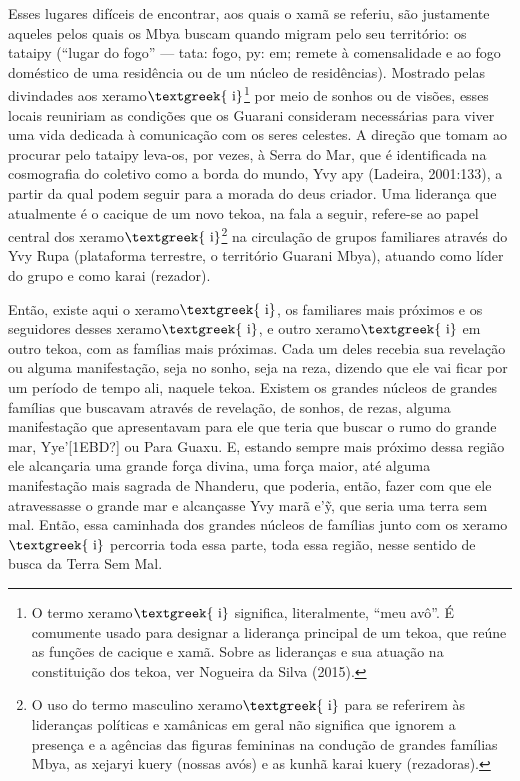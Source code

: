\documentclass{article}
\begin{document}
Esses lugares dif\'iceis de encontrar, aos quais o xam\~a se referiu,
s\~ao justamente aqueles pelos quais os Mbya buscam quando migram pelo
seu territ\'orio: os tataipy ({\textquotedblleft}lugar do
fogo{\textquotedblright} --- tata: fogo, py: em; remete \`a
comensalidade e ao fogo dom\'estico de uma resid\^encia ou de um
n\'ucleo de resid\^encias). Mostrado pelas divindades aos
xeramo$\text{\textgreek{~i}}$\footnote{ O termo
xeramo$\text{\textgreek{~i}}$ significa, literalmente,
{\textquotedblleft}meu av\^o{\textquotedblright}. \'E comumente usado
para designar a lideran\c{c}a principal de um tekoa, que re\'une as
fun\c{c}\~oes de cacique e xam\~a. Sobre as lideran\c{c}as e sua
atua\c{c}\~ao na constitui\c{c}\~ao dos tekoa, ver Nogueira da Silva
(2015).} por meio de sonhos ou de vis\~oes, esses locais reuniriam as
condi\c{c}\~oes que os Guarani consideram necess\'arias para viver uma
vida dedicada \`a comunica\c{c}\~ao com os seres celestes. A
dire\c{c}\~ao que tomam ao procurar pelo tataipy leva-os, por vezes,
\`a Serra do Mar, que \'e identificada na cosmografia do coletivo como
a borda do mundo, Yvy apy (Ladeira, 2001:133), a partir da qual podem
seguir para a morada do deus criador. Uma lideran\c{c}a que atualmente
\'e o cacique de um novo tekoa, na fala a seguir, refere-se ao papel
central dos xeramo$\text{\textgreek{~i}}$\footnote{ O uso do termo
masculino xeramo$\text{\textgreek{~i}}$ para se referirem \`as
lideran\c{c}as pol\'iticas e xam\^anicas em geral n\~ao significa que
ignorem a presen\c{c}a e a ag\^encias das figuras femininas na
condu\c{c}\~ao de grandes fam\'ilias Mbya, as xejaryi kuery (nossas
av\'os) e as kunh\~a karai kuery (rezadoras).} na circula\c{c}\~ao de
grupos familiares atrav\'es do Yvy Rupa (plataforma terrestre, o
territ\'orio Guarani Mbya), atuando como l\'ider do grupo e como karai
(rezador).

Ent\~ao, existe aqui o xeramo$\text{\textgreek{~i}}$, os familiares mais
pr\'oximos e os seguidores desses xeramo$\text{\textgreek{~i}}$, e
outro xeramo$\text{\textgreek{~i}}$ em outro tekoa, com as fam\'ilias
mais pr\'oximas. Cada um deles recebia sua revela\c{c}\~ao ou alguma
manifesta\c{c}\~ao, seja no sonho, seja na reza, dizendo que ele vai
ficar por um per\'iodo de tempo ali, naquele tekoa. Existem os grandes
n\'ucleos de grandes fam\'ilias que buscavam atrav\'es de
revela\c{c}\~ao, de sonhos, de rezas, alguma manifesta\c{c}\~ao que
apresentavam para ele que teria que buscar o rumo do grande mar,
Yye{\textquoteright}[1EBD?] ou Para Guaxu. E, estando sempre mais
pr\'oximo dessa regi\~ao ele alcan\c{c}aria uma grande for\c{c}a
divina, uma for\c{c}a maior, at\'e alguma manifesta\c{c}\~ao mais
sagrada de Nhanderu, que poderia, ent\~ao, fazer com que ele
atravessasse o grande mar e alcan\c{c}asse Yvy mar\~a
e{\textquoteright}\~{y}, que seria uma terra sem mal. Ent\~ao, essa
caminhada dos grandes n\'ucleos de fam\'ilias junto com os
xeramo$\text{\textgreek{~i}}$ percorria toda essa parte, toda essa
regi\~ao, nesse sentido de busca da Terra Sem Mal.
\end{document}
